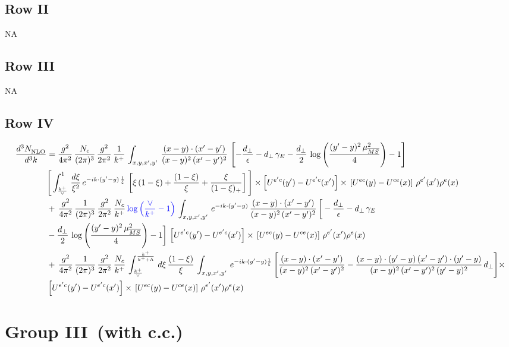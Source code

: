 \documentclass[9pt]{article}
\numberwithin{equation}{section}
\begin{document}
\subsection{Row II}
\textsc{NA}
\subsection{Row III}
\textsc{NA}
\subsection{Row IV}
\begin{align}
    \frac{d^{3}N_{\rm NLO}^{\rm}}{d^{3}k}  & = \frac{g^{2}}{4\pi^{2}}\, \frac{N_{c}}{(2\pi)^{3}}\,\frac{g^{2}}{2\pi^{2}}\, \frac{1}{k^{+}}\,\int_{x,y,x',y'}\,\frac{(x-y)\cdot (x'-y')}{(x-y)^{2}\,(x'-y')^{2}}\,\left[-\frac{d_{\perp}}{\epsilon}-d_{\perp}\,\gamma_{E}-\frac{d_{\perp}}{2}\,\log{\left(\frac{(y'-y)^{2}\,\mu^{2}_{\overline{MS}}}{4}\right)}-1\right]\,\notag \\ & \Bigg[\int_{\frac{k^{+}}{\vee}}^{1}\,\frac{d\xi}{\xi^{2}}\,e^{-ik\cdot (y'-y)\,\frac{1}{\xi}}\,\left[\xi\,(1-\xi)+\frac{(1-\xi)}{\xi}+\frac{\xi}{(1-\xi)_{+}}\right]\Bigg]\times \left[U^{e'c}(y') - U^{e'c}(x')\right] \times\, \left[U^{ec}(y) - U^{ce}(x)\right]\, \rho^{e'}(x') \rho^{e}(x)\notag \\ &  +\, \frac{g^{2}}{4\pi^{2}}\, \frac{1}{(2\pi)^{3}}\,\frac{g^{2}}{2\pi^{2}}\, \frac{N_{c}}{k^{+}}\,{\color{blue}\log{\left(\frac{\vee}{k^{+}}-1\right)}}\,\int_{x,y,x',y'}\,e^{-ik\cdot (y'-y)}\,\frac{(x-y)\cdot (x'-y')}{(x-y)^{2}\,(x'-y')^{2}}\,\bigg[-\frac{d_{\perp}}{\epsilon}-d_{\perp}\,\gamma_{E}\notag \\ & -\frac{d_{\perp}}{2}\,\log{\left(\frac{(y'-y)^{2}\,\mu^{2}_{\overline{MS}}}{4}\right)}-1\bigg]\,\left[U^{e'c}(y') - U^{e'c}(x')\right] \times\, \left[U^{ec}(y) - U^{ce}(x)\right]\, \rho^{e'}(x') \rho^{e}(x)\notag \\ & +\,\frac{g^{2}}{4\pi^{2}}\, \frac{1}{(2\pi)^{3}}\,\frac{g^{2}}{2\pi^{2}}\, \frac{N_{c}}{k^{+}}\,\int_{\frac{k^{+}}{\vee}}^{\frac{k^{+}}{k^{+}+\Lambda}}\,d\xi\, \frac{(1-\xi)}{\xi}\, \int_{x,y,x',y'}\,e^{-ik\cdot (y'-y)\frac{1}{\xi}}\,\Bigg[\frac{(x-y)\cdot (x'-y')}{(x-y)^{2}\, (x'-y')^{2}} -\frac{(x-y)\cdot (y'-y)\, (x'-y')\cdot (y'-y)}{(x-y)^{2}\,(x'-y')^{2}\,(y'-y)^{2}}\,d_{\perp}\Bigg]\times\notag \\ &  \left[U^{e'c}(y') - U^{e'c}(x')\right] \times\, \left[U^{ec}(y) - U^{ce}(x)\right]\, \rho^{e'}(x') \rho^{e}(x)
\end{align}
\section{Group III\, (with c.c.)}
\end{document}
